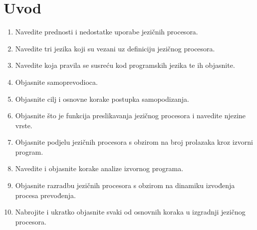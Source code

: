 \documentclass[times, 12pt, utf8]{book}
\begin{document}

\chapter{Uvod}


\begin{enumerate}

\item
Navedite prednosti i nedostatke uporabe jezičnih procesora. \cite[str.~1]{udzbenik}

\item
Navedite tri jezika koji su vezani uz definiciju jezičnog procesora. \cite[str.~3]{udzbenik}

\item
Navedite koja pravila se susreću kod programskih jezika te ih objasnite. \cite[str.~4-11]{udzbenik}

\item
Objasnite samoprevodioca. \cite[str.~27]{udzbenik}

\item
Objasnite cilj i osnovne korake postupka samopodizanja. \cite[str.~27]{udzbenik}

\item
Objasnite što je funkcija preslikavanja jezičnog procesora i navedite njezine vrste. \cite[str.~26]{udzbenik}

\item
Objasnite podjelu jezičnih procesora s obzirom na broj prolazaka kroz izvorni program. \cite[str.~24-26]{udzbenik}

\item
Navedite i objasnite korake analize izvornog programa. \cite[str.~3-13]{udzbenik}

\item
Objasnite razradbu jezičnih procesora s obzirom na dinamiku izvođenja procesa prevođenja. \cite[str.~24-26]{udzbenik}

\item
Nabrojite i ukratko objasnite svaki od osnovnih koraka u izgradnji jezičnog procesora. \cite[str.~3]{udzbenik}


\end{enumerate}
\end{document}
